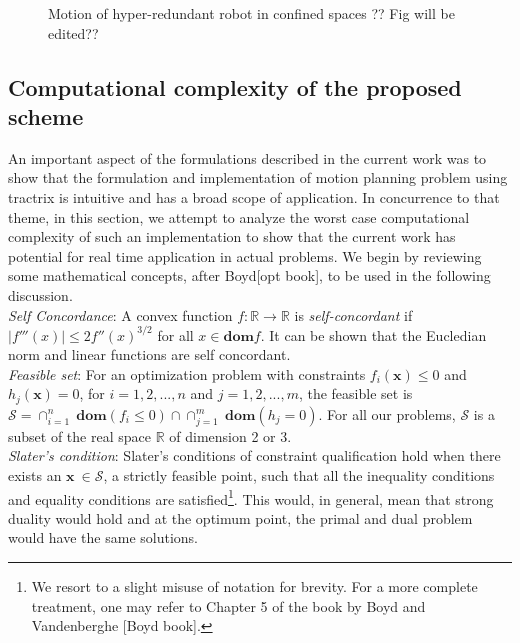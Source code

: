 \documentclass[12pt,a4]{article}
\begin{document}
\begin{figure}[ht!]
\begin{subfigure}{0.3\textwidth}
    \end{subfigure}
    \caption{ Motion of hyper-redundant robot in confined spaces ?? Fig will be edited??}
\end{figure}

\subsection{Computational complexity of the proposed scheme} \label{sc:Complexity}

An important aspect of the formulations described in the current work was to show that the formulation and implementation of motion planning problem using tractrix is intuitive and has a broad scope of application. In concurrence to that theme, in this section, we attempt to analyze the worst case computational complexity of such an implementation to show that the current work has potential for real time application in actual problems. We begin by reviewing some mathematical concepts, after Boyd[opt book], to be used in the following discussion.\\
\indent \textit{Self Concordance}: A convex function $f: \mathbb{R} \to \mathbb{R}$ is \textit{self-concordant} if $|f'''(x)|\leq 2f''(x)^{3/2}$ for all $x \in \textbf{dom}f$. It can be shown that the Eucledian norm and linear functions are self concordant.\\
\indent \textit{Feasible set}: For an optimization problem with constraints $f_i(\textbf{x})\leq 0$ and $h_j(\textbf{x})=0$, for $i=1,2,...,n$ and $j=1,2,...,m$, the feasible set is $\mathcal{S}=\cap_{i=1}^n~\textbf{dom}(f_i\leq0)\cap\cap_{j=1}^m~\textbf{dom}(h_j=0)$. For all our problems, $\mathcal{S} $ is a subset of the real space $\mathbb{R}$ of dimension 2 or 3.\\
\indent \textit{Slater's condition}: Slater's conditions of constraint qualification hold when there exists an $\textbf{x}~ \in \mathcal{S}$, a strictly feasible point,  such that all the inequality conditions and equality conditions are satisfied\footnote{We resort to a slight misuse of notation for brevity. For a more complete treatment, one may refer to Chapter 5 of the book by Boyd and Vandenberghe [Boyd book].}. This would, in general, mean that strong duality would hold and at the optimum point, the primal and dual problem would have the same solutions.\\
\end{document}
